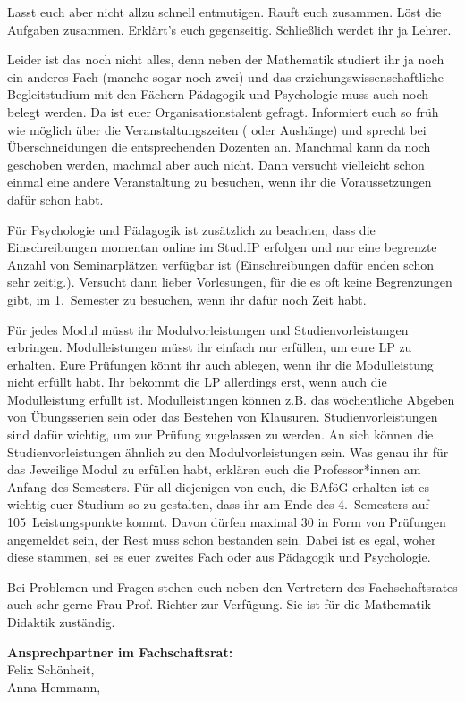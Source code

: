 Lasst euch aber nicht allzu schnell entmutigen.
Rauft euch zusammen.
Löst die Aufgaben zusammen.
Erklärt’s euch gegenseitig.
Schließlich werdet ihr ja Lehrer.

Leider ist das noch nicht alles, denn neben der Mathematik studiert ihr ja noch ein anderes Fach (manche sogar noch zwei) und das erziehungswissenschaftliche Begleitstudium mit den Fächern Pädagogik und Psychologie muss auch noch belegt werden.
Da ist euer Organisationstalent gefragt.
Informiert euch so früh wie möglich über die Veranstaltungszeiten ( oder Aushänge) und sprecht bei Überschneidungen die entsprechenden Dozenten an.
Manchmal kann da noch geschoben werden, machmal aber auch nicht.
Dann versucht vielleicht schon einmal eine andere Veranstaltung zu besuchen, wenn ihr die Voraussetzungen dafür schon habt.

Für Psychologie und Pädagogik ist zusätzlich zu beachten, dass die Einschreibungen momentan online im Stud.IP erfolgen und nur eine begrenzte Anzahl von Seminarplätzen verfügbar ist (Einschreibungen dafür enden schon sehr zeitig.).
Versucht dann lieber Vorlesungen, für die es oft keine Begrenzungen gibt, im 1.~Semester zu besuchen, wenn ihr dafür noch Zeit habt.

Für jedes Modul müsst ihr Modulvorleistungen und Studienvorleistungen erbringen. Modulleistungen müsst ihr einfach nur erfüllen, um eure LP zu erhalten. Eure Prüfungen könnt ihr auch ablegen, wenn ihr die Modulleistung nicht erfüllt habt. Ihr bekommt die LP allerdings erst, wenn auch die Modulleistung erfüllt ist. Modulleistungen können z.B. das wöchentliche Abgeben von Übungsserien sein oder das Bestehen von Klausuren.
Studienvorleistungen sind dafür wichtig, um zur Prüfung zugelassen zu werden. An sich können die Studienvorleistungen ähnlich zu den Modulvorleistungen sein. Was genau ihr für das Jeweilige Modul zu erfüllen habt, erklären euch die Professor*innen am Anfang des Semesters.
Für all diejenigen von euch, die BAföG erhalten ist es wichtig euer Studium so zu gestalten, dass ihr am Ende des 4.~Semesters auf 105~Leistungspunkte kommt.
Davon dürfen maximal 30 in Form von Prüfungen angemeldet sein, der Rest muss schon bestanden sein.
Dabei ist es egal, woher diese stammen, sei es euer zweites Fach oder aus Pädagogik und Psychologie.

Bei Problemen und Fragen stehen euch neben den Vertretern des Fachschaftsrates auch sehr gerne Frau Prof. Richter zur Verfügung.
Sie ist für die Mathematik-Didaktik zuständig.


\textbf{Ansprechpartner im Fachschaftsrat:}\\
Felix Schönheit, \\
Anna Hemmann, 

\label{studiengang_lehramt}

\label{studiengang_lag}

\label{studiengang_las}




